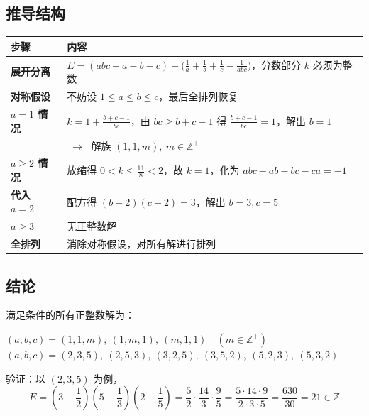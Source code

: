 \documentclass[11pt,a4paper]{ctexart}
\begin{document}
\begin{summarybox}

\subsection*{推导结构}

\begin{center}
\begin{tabular}{@{}>{\sffamily\bfseries}p{3.2cm} p{10.5cm}@{}}
\toprule
\textbf{步骤} & \textbf{内容} \\
\midrule
展开分离 & $E = (abc-a-b-c) + \bigl(\frac{1}{a}+\frac{1}{b}+\frac{1}{c}-\frac{1}{abc}\bigr)$，分数部分 $k$ 必须为整数 \\
对称假设 & 不妨设 $1 \le a \le b \le c$，最后全排列恢复 \\
$a=1$ 情况 & $k=1+\frac{b+c-1}{bc}$，由 $bc \ge b+c-1$ 得 $\frac{b+c-1}{bc}=1$，解出 $b=1$ \\
& $\;\to\;$ 解族 $(1,1,m),\ m\in\mathbb{Z}^+$ \\
$a \ge 2$ 情况 & 放缩得 $0<k\le\frac{11}{8}<2$，故 $k=1$，化为 $abc-ab-bc-ca=-1$ \\
代入 $a=2$ & 配方得 $(b-2)(c-2)=3$，解出 $b=3,c=5$ \\
$a \ge 3$ & 无正整数解 \\
全排列 & 消除对称假设，对所有解进行排列 \\
\bottomrule
\end{tabular}
\end{center}

\vspace{1em}

\subsection*{结论}

满足条件的所有正整数解为：

\begin{center}
\begin{tcolorbox}[
  enhanced, colframe=accent!80, colback=accent!10,
  sharp corners, boxrule=1.5pt, width=14cm, center,
]
  \begin{center}
    {\color{maincolor}\sffamily\bfseries\large
      $(a,b,c) = (1, 1, m),\ (1, m, 1),\ (m, 1, 1) \quad (m \in \mathbb{Z}^+)$
    }\\[6pt]
    {\color{maincolor}\sffamily\bfseries\large
      $(a,b,c) = (2, 3, 5),\ (2, 5, 3),\ (3, 2, 5),\ (3, 5, 2),\ (5, 2, 3),\ (5, 3, 2)$
    }
  \end{center}
\end{tcolorbox}
\end{center}

验证：以 $(2,3,5)$ 为例，
\[
  E = \left(3 - \frac{1}{2}\right)\left(5 - \frac{1}{3}\right)\left(2 - \frac{1}{5}\right)
    = \frac{5}{2} \cdot \frac{14}{3} \cdot \frac{9}{5}
    = \frac{5 \cdot 14 \cdot 9}{2 \cdot 3 \cdot 5}
    = \frac{630}{30} = 21 \in \mathbb{Z}
\]

\end{summarybox}
\end{document}

